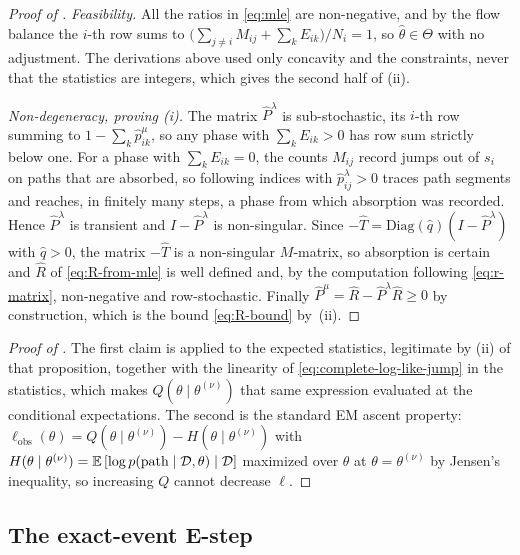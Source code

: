 \documentclass{article}
\newcommand{\ex}[1]{\mathbb{E}\left[#1\right]}
\begin{document}
\begin{proof}[Proof of ]
\emph{Feasibility.} All the ratios in \eqref{eq:mle} are non-negative, and by the flow balance the
$i$-th row sums to $\big(\sum_{j\neq i} M_{ij} + \sum_k E_{ik}\big)/N_i = 1$, so
$\hat\theta\in\Theta$ with no adjustment. The derivations above used only concavity and the
constraints, never that the statistics are integers, which gives the second half of \textup{(ii)}.

\emph{Non-degeneracy, proving \textup{(i)}.} The matrix $\widehat P^\lambda$ is sub-stochastic, its
$i$-th row summing to $1-\sum_k \hat p^\mu_{ik}$, so any phase with $\sum_k E_{ik}>0$ has row sum
strictly below one. For a phase with $\sum_k E_{ik}=0$, the counts $M_{ij}$ record jumps out of $s_i$
on paths that are absorbed, so following indices with $\hat p^\lambda_{ij}>0$ traces path segments
and reaches, in finitely many steps, a phase from which absorption was recorded. Hence
$\widehat P^\lambda$ is transient and $I-\widehat P^\lambda$ is non-singular. Since
$-\widehat T = \mathrm{Diag}(\hat q)(I-\widehat P^\lambda)$ with $\hat q>0$, the matrix $-\widehat T$
is a non-singular $M$-matrix, so absorption is certain and $\widehat R$ of \eqref{eq:R-from-mle} is
well defined and, by the computation following \eqref{eq:r-matrix}, non-negative and row-stochastic.
Finally $\widehat P^\mu = \widehat R - \widehat P^\lambda \widehat R \ge 0$ by construction, which is
the bound \eqref{eq:R-bound} by \,\textup{(ii)}.
\end{proof}

\begin{proof}[Proof of ]
The first claim is  applied to the expected statistics, legitimate by
\textup{(ii)} of that proposition, together with the linearity of
\eqref{eq:complete-log-like-jump} in the statistics, which makes $Q(\theta\mid\theta^{(\nu)})$ that
same expression evaluated at the conditional expectations. The second is the standard EM ascent
property: $\ell_{\mathrm{obs}}(\theta)=Q(\theta\mid\theta^{(\nu)})-H(\theta\mid\theta^{(\nu)})$ with
$H(\theta\mid\theta^{(\nu)})=\ex{\log p(\text{path}\mid{\cal D},\theta) \mid {\cal D}}$ maximized over
$\theta$ at $\theta=\theta^{(\nu)}$ by Jensen's inequality, so increasing $Q$ cannot decrease $\ell$.
\end{proof}

\subsection{The exact-event E-step}
\end{document}
